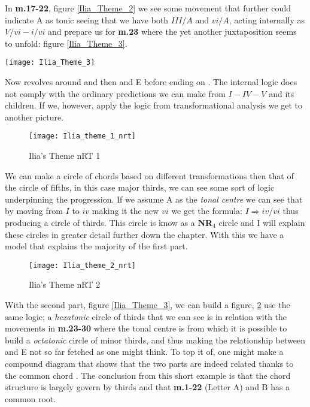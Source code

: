 In \textbf{m.17-22}, figure \ref{Ilia_Theme_2} we see some movement that further could indicate A as tonic seeing that we have both \(III/A\) and \(vi/A\), acting internally as \(V/vi-i/vi\) and prepare us for \textbf{m.23} where the yet another juxtaposition seems to unfold: figure \ref{Ilia_Theme_3}.

\begin{figure*}[h!]
\texttt{[image: Ilia\_Theme\_3]}
	\caption{Ilia's Theme 3}
	\label{Ilia_Theme_3}
\end{figure*}

Now \ciss revolves around \bflat and then \bflat and E before ending on . The internal logic does not comply with the ordinary predictions we can make from \(I-IV-V\) and its children. If we, however, apply the logic from transformational analysis we get to another picture. 

\begin{figure}[h!]
\center
\texttt{[image: Ilia\_theme\_1\_nrt]}
	\caption{Ilia's Theme nRT 1}
	\label{Ilia_theme_1_nrt}
\end{figure}

We can make a circle of chords based on different transformations then that of the circle of fifths, in this case major thirds, we can see some sort of logic underpinning the progression. If we assume A as the \textit{tonal centre} we can see that by moving from \(I\) to \(iv\) making it the new \(vi\) we get the formula: \({I}\Rightarrow{iv/vi}\) thus producing a circle of thirds. This circle is know as a \textbf{NR\(_{4}\)} circle and I will explain these circles in greater detail further down the chapter. With this we have a model that explains the majority of the first part. 

\begin{figure}[h!]
\center
\texttt{[image: Ilia\_theme\_2\_nrt]}
	\caption{Ilia's Theme nRT 2}
	\label{Ilia_theme_2_nrt}
\end{figure}

With the second part, figure \ref{Ilia_Theme_3}, we can build a figure, \ref{Ilia_theme_2_nrt} use the same logic; a \textit{hexatonic} circle of thirds that we can see is in relation with the movements in \textbf{m.23-30} where the tonal centre is \ciss from which it is possible to build a \textit{octatonic} circle of minor thirds, and thus making the relationship between \bflat and E not so far fetched as one might think. To top it of, one might make a compound diagram that shows that the two parts are indeed related thanks to the common chord \ciss. The conclusion from this short example is that the chord structure is largely govern by thirds and that \textbf{m.1-22} (Letter A) and B has a common root.

